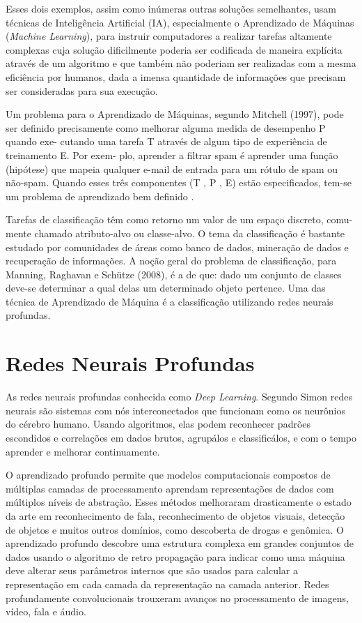 \documentclass[openright]{UFRGS} %
\begin{document}
Esses dois exemplos, assim como inúmeras outras soluções semelhantes, usam
técnicas de Inteligência Artificial (IA), especialmente o Aprendizado de Máquinas (\textit{Machine Learning}), para instruir computadores a realizar tarefas altamente complexas cuja solução dificilmente poderia ser codificada de maneira explícita através de um algoritmo e que também não poderiam ser realizadas com a mesma eficiência por
humanos, dada a imensa quantidade de informações que precisam ser consideradas para sua execução.

Um problema para o Aprendizado de Máquinas, segundo Mitchell (1997), pode
ser definido precisamente como melhorar alguma medida de desempenho P quando exe-
cutando uma tarefa T através de algum tipo de experiência de treinamento E. Por exem-
plo, aprender a filtrar spam é aprender uma função (hipótese) que mapeia qualquer e-mail
de entrada para um rótulo de spam ou não-spam. Quando esses três componentes (T , P ,
E) estão especificados, tem-se um problema de aprendizado bem definido \cite{mitchellmachine}.

Tarefas de classificação têm como retorno um valor de um espaço discreto, comu-
mente chamado atributo-alvo ou classe-alvo. O tema da classificação é bastante estudado
por comunidades de áreas como banco de dados, mineração de dados e recuperação de
informações. A noção geral do problema de classificação, para Manning, Raghavan e
Schütze (2008), é a de que: dado um conjunto de classes deve-se determinar a qual delas
um determinado objeto pertence. Uma das técnica de Aprendizado de Máquina é a classificação utilizando redes neurais profundas. 

\section{Redes Neurais Profundas}

As redes neurais profundas conhecida como \textit{Deep Learning}. Segundo Simon \cite{haykin2007redes} redes neurais são sistemas com nós interconectados que funcionam como os neurônios do cérebro humano. Usando algoritmos, elas podem reconhecer padrões escondidos e correlações em dados brutos, agrupálos e classificálos, e com o tempo aprender e melhorar continuamente.

O aprendizado profundo permite que modelos computacionais compostos de múltiplas camadas de processamento aprendam representações de dados com múltiplos níveis de abstração. Esses métodos melhoraram drasticamente o estado da arte em reconhecimento de fala, reconhecimento de objetos visuais, detecção de objetos e muitos outros domínios, como descoberta de drogas e genômica. O aprendizado profundo descobre uma estrutura complexa em grandes conjuntos de dados usando o algoritmo de retro propagação para indicar como uma máquina deve alterar seus parâmetros internos que são usados para calcular a representação em cada camada da representação na camada anterior. Redes profundamente convolucionais trouxeram avanços no processamento de imagens, vídeo, fala e áudio.
\end{document}

